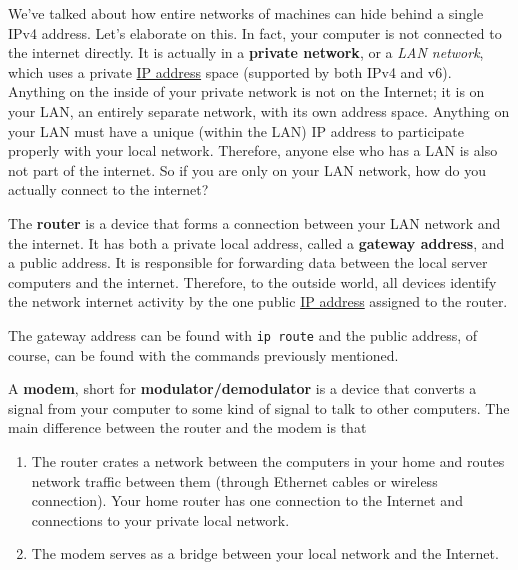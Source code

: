 \documentclass{article}
\newcounter{definition}[section]
\begin{document}
      We've talked about how entire networks of machines can hide behind a single IPv4 address. Let's elaborate on this. In fact, your computer is not connected to the internet directly. It is actually in a \textbf{private network}, or a \textit{LAN network}, which uses a private \hyperref[def:ip-address]{IP address} space (supported by both IPv4 and v6). Anything on the inside of your private network is not on the Internet; it is on your LAN, an entirely separate network, with its own address space. Anything on your LAN must have a unique (within the LAN) IP address to participate properly with your local network. Therefore, anyone else who has a LAN is also not part of the internet. So if you are only on your LAN network, how do you actually connect to the internet? 

      \begin{definition}[Router]
        \label{def:router-2}
 
        The \textbf{router} is a device that forms a connection between your LAN network and the internet. It has both a private local address, called a \textbf{gateway address}, and a public address. It is responsible for forwarding data between the local server computers and the internet. Therefore, to the outside world, all devices identify the network internet activity by the one public \hyperref[def:ip-address]{IP address} assigned to the router. 

        The gateway address can be found with \texttt{ip route} and the public address, of course, can be found with the commands previously mentioned. 
      \end{definition}

      \begin{definition}[Modem]
        \label{def:modem-2}
        A \textbf{modem}, short for \textbf{modulator/demodulator} is a device that converts a signal from your computer to some kind of signal to talk to other computers. The main difference between the router and the modem is that 
        \begin{enumerate} 
           \item The router crates a network between the computers in your home and routes network traffic between them (through Ethernet cables or wireless connection). Your home router has one connection to the Internet and connections to your private local network. 

          \item The modem serves as a bridge between your local network and the Internet.  
        \end{enumerate}
      \end{definition}
\end{document}
